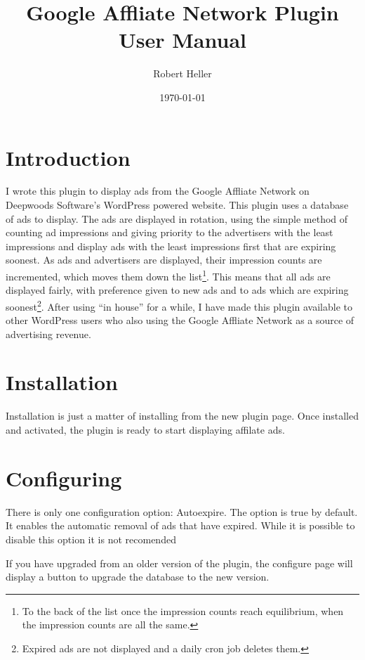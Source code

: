 \documentclass[letterpaper]{article}
\title{Google Affliate Network Plugin User Manual}
\author{Robert Heller}
\date{\today}
\begin{document}
\maketitle

\tableofcontents

\section{Introduction}

I wrote this plugin to display ads from the Google Affliate Network on
Deepwoods Software's WordPress powered website. This plugin uses a
database of ads to display.  The ads are displayed in rotation, using
the simple method of counting ad impressions and giving priority to the
advertisers with the least impressions and display ads with the least
impressions first that are expiring soonest.  As ads and advertisers
are displayed, their impression counts are incremented, which moves
them down the list\footnote{To the back of the list once the impression
counts reach equilibrium, when the impression counts are all the
same.}.  This means that all ads are displayed fairly, with preference
given to new ads and to ads which are expiring soonest\footnote{Expired
ads are not displayed and a daily cron job deletes them.}. After using
``in house'' for a while, I have made this plugin available to other
WordPress users who also using the Google Affliate Network as a source
of advertising revenue.

\section{Installation}

Installation is just a matter of installing from the new plugin
page.  Once installed and activated, the plugin is ready to start
displaying affilate ads.

\section{Configuring}

There is only one configuration option: Autoexpire. The option is
true by default.  It enables the automatic removal of ads that have
expired. While it is possible to disable this option it is not
recomended

If you have upgraded from an older version of the plugin, the
configure page will display a button to upgrade the database to the new
version.
\end{document}
